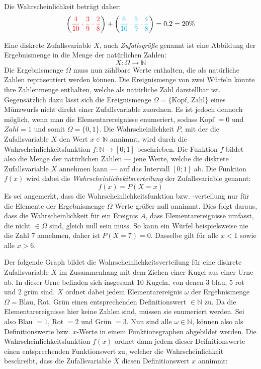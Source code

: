 \vspace{\parskip}

Die Wahrscheinlichkeit betr\"{a}gt daher: $$\left({\color{red} \frac{4}{10} \cdot \frac{3}{9} \cdot \frac{2}{8}}\right) + \left({\color{cyan} \frac{6}{10} \cdot \frac{5}{9} \cdot \frac{4}{8}}\right) = 0.2 = 20 \%$$


Eine diskrete Zufallsvariable $X$, auch \emph{Zufallsgr\"{o}\ss{}e} genannt ist eine Abbildung der Ergebnismenge in die Menge der nat\"{u}rlichen Zahlen: $$X: \Omega \rightarrow \mathbb{N}$$ Die Ergebnismenge $\Omega$ muss nun z\"{a}hlbare Werte enthalten, die als nat\"{u}rliche Zahlen repr\"{a}sentiert werden k\"{o}nnen. Die Ereignismenge von zwei W\"{u}rfeln k\"{o}nnte ihre Zahlenmenge enthalten, welche als nat\"{u}rliche Zahl darstellbar ist. Gegens\"{a}tzlich dazu l\"{a}sst sich die Ereignismenge $\Omega = \{ \text{Kopf, Zahl} \}$ eines M\"{u}nzwurfs nicht direkt einer Zufallsvariable zuordnen. Es ist jedoch dennoch m\"{o}glich, wenn man die Elementarereignisse enumeriert, sodass Kopf $= 0$ und $Zahl = 1$ und somit $\Omega = \{0 , 1\}$. Die Wahrscheinlichkeit $P$, mit der die Zufallsvariable $X$ den Wert $x \in \mathbb{N}$ annimmt, wird durch die Wahrscheinlichkeitsfunktion $f: \mathbb{N} \rightarrow [0 ; 1]$ beschrieben. Die Funktion $f$ bildet also die Menge der nat\"{u}rlichen Zahlen --- jene Werte, welche die diskrete Zufallsvariable $X$ annehmen kann --- auf das Intervall $[0 ; 1]$ ab. Die Funktion $f(x)$ wird dabei die \emph{Wahrscheinlichekitsverteilung} der Zufallsvariable genannt: $$f(x) = P(X = x)$$ Es sei angemerkt, dass die Wahrscheinlichkeitsfunktion bzw. -verteilung nur f\"{u}r die Elemente der Ergebnismenge $\Omega$ Werte gr\"{o}\ss{}er null annimmt. Dies folgt daraus, dass die Wahrscheinlichkeit f\"{u}r ein Ereignis $A$, dass Elementarereignisse umfasst, die nicht $\in \Omega$ sind, gleich null sein muss. So kann ein W\"{u}rfel beispielsweise nie die Zahl 7 annehmen, daher ist $P(X = 7) = 0$. Dasselbe gilt f\"{u}r alle $x < 1$ sowie alle $x > 6$.

\pagebreak

Der folgende Graph bildet die Wahrscheinlichkeitsverteilung f\"{u}r eine diskrete Zufallsvariable $X$ im Zusammenhang mit dem Ziehen einer Kugel aus einer Urne ab. In dieser Urne befinden sich insgesamt 10 Kugeln, von denen 3 blau, 5 rot und 2 gr\"{u}n sind. $X$ ordnet dabei jedem Elementarereignis $\omega$ der Ergebnismenge $\Omega = {\text{Blau, Rot, Gr\"{u}n}}$ einen entsprechenden Definitionswert $\in \mathbb{N}$ zu. Da die Elementarereignisse hier keine Zahlen sind, m\"{u}ssen sie enumeriert werden. Sei also Blau $= 1$, Rot $= 2$ und Gr\"{u}n $= 3$. Nun sind alle $\omega \in \mathbb{N}$, k\"{o}nnen also als Definitionswerte bzw. $x$-Werte in einem Funktionsgraphen abgebildet werden. Die Wahrscheinlichkeitsfunktion $f(x)$ ordnet dann jedem dieser Deifnitionswerte einen entsprechenden Funktionswert zu, welcher die Wahrscheinlichkeit beschreibt, dass die Zufallsvariable $X$ diesen Definitionswert $x$ annimmt:

